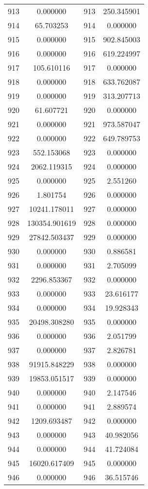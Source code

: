 \documentclass[12pt]{article}
\begin{document}
\begin{longtable}{@{}cccc@{}}
913 & 0.000000 & 913 & 250.345901 \\
914 & 65.703253 & 914 & 0.000000 \\
915 & 0.000000 & 915 & 902.845003 \\
916 & 0.000000 & 916 & 619.224997 \\
917 & 105.610116 & 917 & 0.000000 \\
918 & 0.000000 & 918 & 633.762087 \\
919 & 0.000000 & 919 & 313.207713 \\
920 & 61.607721 & 920 & 0.000000 \\
921 & 0.000000 & 921 & 973.587047 \\
922 & 0.000000 & 922 & 649.789753 \\
923 & 552.153068 & 923 & 0.000000 \\
924 & 2062.119315 & 924 & 0.000000 \\
925 & 0.000000 & 925 & 2.551260 \\
926 & 1.801754 & 926 & 0.000000 \\
927 & 10241.178011 & 927 & 0.000000 \\
928 & 130354.901619 & 928 & 0.000000 \\
929 & 27842.503437 & 929 & 0.000000 \\
930 & 0.000000 & 930 & 0.886581 \\
931 & 0.000000 & 931 & 2.705099 \\
932 & 2296.853367 & 932 & 0.000000 \\
933 & 0.000000 & 933 & 23.616177 \\
934 & 0.000000 & 934 & 19.928343 \\
935 & 20498.308280 & 935 & 0.000000 \\
936 & 0.000000 & 936 & 2.051799 \\
937 & 0.000000 & 937 & 2.826781 \\
938 & 91915.848229 & 938 & 0.000000 \\
939 & 19853.051517 & 939 & 0.000000 \\
940 & 0.000000 & 940 & 2.147546 \\
941 & 0.000000 & 941 & 2.889574 \\
942 & 1209.693487 & 942 & 0.000000 \\
943 & 0.000000 & 943 & 40.982056 \\
944 & 0.000000 & 944 & 41.724084 \\
945 & 16020.617409 & 945 & 0.000000 \\
946 & 0.000000 & 946 & 36.515746 \\

\end{longtable}
\end{document}
